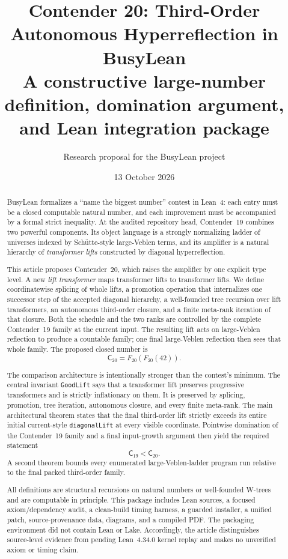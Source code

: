 \documentclass[11pt]{article}
\title{\textbf{Contender 20: Third-Order Autonomous Hyperreflection in BusyLean}\\[0.35em]
  \large A constructive large-number definition, domination argument, and Lean integration package}
\author{Research proposal for the BusyLean project}
\date{13 October 2026}
\theoremstyle{definition}
\theoremstyle{remark}
\newcommand{\leanname}[1]{\nolinkurl{#1}}
\newcommand{\Cnineteen}{\mathsf{C}_{19}}
\newcommand{\Ctwenty}{\mathsf{C}_{20}}
\begin{document}
\maketitle

\begin{abstract}
BusyLean formalizes a ``name the biggest number'' contest in Lean~4: each entry
must be a closed computable natural number, and each improvement must be
accompanied by a formal strict inequality.  At the audited repository head,
Contender~19 combines two powerful components.  Its object language is a
strongly normalizing ladder of universes indexed by Sch\"utte-style
large-Veblen terms, and its amplifier is a natural hierarchy of
\emph{transformer lifts} constructed by diagonal hyperreflection.

This article proposes Contender~20, which raises the amplifier by one explicit
type level.  A new \emph{lift transformer} maps transformer lifts to transformer
lifts.  We define coordinatewise splicing of whole lifts, a promotion operation
that internalizes one successor step of the accepted diagonal hierarchy, a
well-founded tree recursion over lift transformers, an autonomous third-order
closure, and a finite meta-rank iteration of that closure.  Both the schedule
and the two ranks are controlled by the complete Contender~19 family at the
current input.  The resulting lift acts on large-Veblen reflection to produce a
countable family; one final large-Veblen reflection then sees that whole family.
The proposed closed number is
\[
  \Ctwenty = F_{20}(F_{20}(42)).
\]

The comparison architecture is intentionally stronger than the contest's
minimum.  The central invariant \leanname{GoodLift} says that a transformer lift
preserves progressive transformers and is strictly inflationary on them.  It is
preserved by splicing, promotion, tree iteration, autonomous closure, and every
finite meta-rank.  The main architectural theorem states that the final
third-order lift strictly exceeds its entire initial current-style
\leanname{diagonalLift} at every visible coordinate.  Pointwise domination of
the Contender~19 family and a final input-growth argument then yield the required
statement
\[
  \Cnineteen < \Ctwenty.
\]
A second theorem bounds every enumerated large-Veblen-ladder program run
relative to the final packed third-order family.

All definitions are structural recursions on natural numbers or well-founded
W-trees and are computable in principle.  This package includes Lean sources,
a focused axiom/dependency audit, a clean-build timing harness, a guarded
installer, a unified patch, source-provenance data, diagrams, and a compiled
PDF.  The packaging environment did not contain Lean or Lake.  Accordingly,
the article distinguishes source-level evidence from pending Lean~4.34.0 kernel
replay and makes no unverified axiom or timing claim.
\end{abstract}
\end{document}

